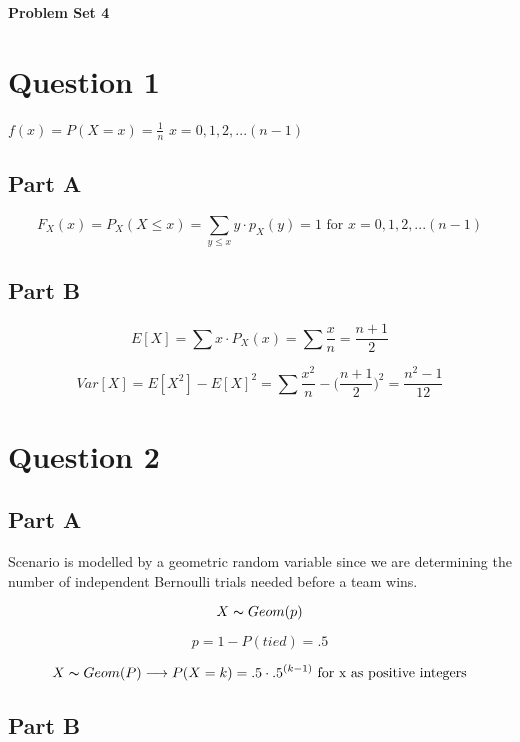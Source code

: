 \documentclass[letterpaper]{article}
\begin{document}
\vspace*{6pt}

\noindent \textbf{\huge{Problem Set 4}}

\bigskip

\section*{Question 1}

\centerline{ $f(x) = P(X = x) = \frac{1}{n}$ \space \space \space \space $x = 0, 1, 2, ... (n-1)$ }

\subsection*{Part A}

$$F_X(x) = P_X(X \leq x) = \sum_{y \leq x} y \cdot p_X (y) = 1 \text{ for } x = 0, 1, 2, ... (n-1)$$

\subsection*{Part B}

$$E[X] = \sum x \cdot P_X(x) = \sum \frac{x}{n} = \frac{n+1}{2}$$

$$Var[X] = E[X^2] - E[X]^2 = \sum \frac{x^2}{n} - \Big( \frac{n+1}{2} \Big)^2 = \frac{n^2 -1}{12}$$

\newpage

\section*{Question 2}

\subsection*{Part A}

Scenario is modelled by a geometric random variable since we are determining the number of independent Bernoulli trials needed before a team wins.

$$X \thicksim Geom(p)$$

$$p = 1 - P(tied) = .5$$

$$X \thicksim Geom(P) \longrightarrow P(X = k) = .5 \cdot .5^{(k-1)} \text{ for x as positive integers}$$

\subsection*{Part B}
\end{document}
